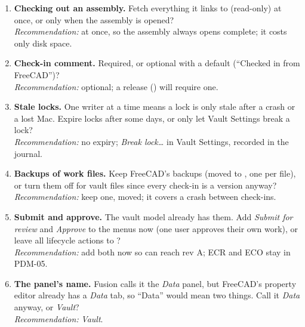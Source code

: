 \begin{enumerate}
  \item \textbf{Checking out an assembly.} Fetch everything it links to (read-only) at once, or only when the
        assembly is opened?\\
        \emph{Recommendation:} at once, so the assembly always opens complete; it costs only disk space.
  \item \textbf{Check-in comment.} Required, or optional with a default (``Checked in from FreeCAD'')?\\
        \emph{Recommendation:} optional; a release () will require one.
  \item \textbf{Stale locks.} One writer at a time means a lock is only stale after a crash or a lost Mac. Expire
        locks after some days, or only let Vault Settings break a lock?\\
        \emph{Recommendation:} no expiry; \emph{Break lock\ldots} in Vault Settings, recorded in the journal.
  \item \textbf{Backups of work files.} Keep FreeCAD's backups (moved to , one per file), or
        turn them off for vault files since every check-in is a version anyway?\\
        \emph{Recommendation:} keep one, moved; it covers a crash between check-ins.
  \item \textbf{Submit and approve.} The vault model already has them. Add \emph{Submit for review} and
        \emph{Approve} to the menus now (one user approves their own work), or leave all lifecycle actions to
        ?\\
        \emph{Recommendation:} add both now so  can reach rev A; ECR and ECO stay in PDM-05.
  \item \textbf{The panel's name.} Fusion calls it the \emph{Data} panel, but FreeCAD's property editor already
        has a \emph{Data} tab, so ``Data'' would mean two things. Call it \emph{Data} anyway, or \emph{Vault}?\\
        \emph{Recommendation:} \emph{Vault}.
\end{enumerate}
